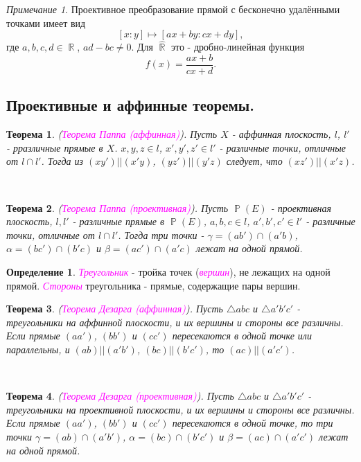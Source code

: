 \documentclass[a4paper,100pt]{article}
\theoremstyle{indented}
\newtheorem{theorem}{Теорема}
\theoremstyle{definition}
\newtheorem{defn}{Определение}
\theoremstyle{remark}
\newtheorem{remark}{Примечание}
\DeclareMathOperator{\RR}{\mathbb{R}}
\DeclareMathOperator{\PP}{\mathbb{P}}
\begin{document}
\begin{remark}
    Проективное преобразование прямой с бесконечно удалёнными точками имеет вид 
    \[
        [x:y]\mapsto [ax+by:cx+dy], 
    \]
    где $a, b, c, d\in \RR$, $ad-bc \neq 0$. Для $\hat{\RR}$ это - дробно-линейная функция
    \[
        f(x)=\frac{ax+b}{cx+d}. 
    \]
\end{remark}

\subsection{Проективные и аффинные теоремы.}

\begin{theorem}
    (\textit{\textcolor{magenta}{\hypertarget{s46}{Теорема Паппа (аффинная)}}}). Пусть $X$ - аффинная плоскость, $l$, $l'$ - рразличные прямые в $X$. $x, y, z\in l$, $x', y', z'\in l'$ - различные точки, отличные от $l \cap l'$. Тогда из $(xy')||(x'y)$, $(yz')||(y'z)$ следует, что $(xz')||(x'z)$. 
\end{theorem} \ 

\begin{theorem}
    (\textit{\textcolor{magenta}{\hypertarget{s47}{Теорема Паппа (проективная)}}}). Пусть $\PP(E)$ - проективная плоскость, $l, l'$ - различные прямые в $\PP(E)$, $a, b, c\in l$, $a', b', c'\in l'$ - различные точки, отличные от $l \cap l'$. Тогда три точки - $\gamma = (ab')\cap(a'b)$, $\alpha=(bc')\cap (b'c)$ и $\beta = (ac')\cap (a'c)$ лежат на одной прямой.
\end{theorem}

\begin{defn}
    \textit{\textcolor{magenta}{\hypertarget{s48}{Треугольник}}} - тройка точек (\textit{\textcolor{magenta}{\hypertarget{s49}{вершин}}}), не лежащих на одной прямой. \textit{\textcolor{magenta}{\hypertarget{s50}{Стороны}}} треугольника - прямые, содержащие пары вершин.
\end{defn}

\begin{theorem}
    (\textit{\textcolor{magenta}{\hypertarget{s51}{Теорема Дезарга (аффинная)}}}). Пусть $\triangle abc$ и $\triangle a'b'c'$ - треугольники на аффинной плоскости, и их вершины и стороны все различны. Если прямые $(aa')$, $(bb')$ и $(cc')$ пересекаются в одной точке или параллельны, и $(ab)||(a'b')$, $(bc)||(b'c')$, то $(ac)||(a'c')$. 
\end{theorem} \ 

\begin{theorem}
    (\textit{\textcolor{magenta}{\hypertarget{s52}{Теорема Дезарга (проективная)}}}). Пусть $\triangle abc$ и $\triangle a'b'c'$ - треугольники на проективной плоскости, и их вершины и стороны все различны. Если прямые $(aa')$, $(bb')$ и $(cc')$ пересекаются в одной точке, то три точки $\gamma = (ab)\cap (a'b')$, $\alpha = (bc)\cap (b'c')$ и $\beta = (ac)\cap (a'c')$ лежат на одной прямой.
\end{theorem}
\end{document}
